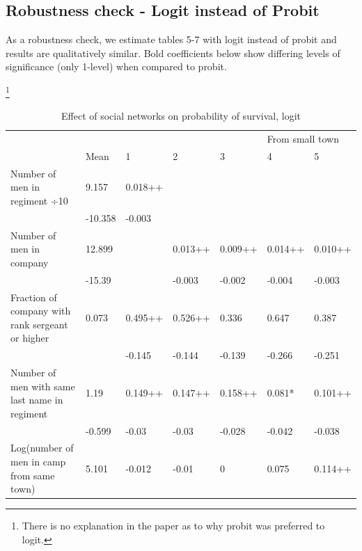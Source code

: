 \documentclass[draft.tex]{subfiles}
\begin{document}
\subsection{Robustness check - Logit instead of Probit}

As a robustness check, we estimate tables 5-7 with logit instead of probit and results are qualitatively similar. Bold coefficients below show differing levels of significance (only 1-level) when compared to probit.

\begin{table}
\caption{Effect of social networks on probability of survival, logit}\footnote{There is no explanation in the paper as to why probit was preferred to logit.}
\label{logit}
\begin{tabular}{lllllll}
\hline
                                                 &         &         &         &         & \multicolumn{2}{l}{From small town} \\
                                                 & Mean    & 1       & 2       & 3       & 4                                   & 5 \\
Number of men in regiment ÷10                    & 9.157   & 0.018++ &         &         &                                     &  \\
                                                 & -10.358 & -0.003  &         &         &                                     &  \\
Number of men in company                         & 12.899  &         & 0.013++ & 0.009++ & 0.014++                             & 0.010++ \\
                                                 & -15.39  &         & -0.003  & -0.002  & -0.004                              & -0.003 \\
Fraction of company with rank sergeant or higher & 0.073   & 0.495++ & 0.526++ & 0.336   & 0.647                               & 0.387 \\
                                                 &         & -0.145  & -0.144  & -0.139  & -0.266                              & -0.251 \\
Number of men with same last name in regiment    & 1.19    & 0.149++ & 0.147++ & 0.158++ & 0.081*                              & 0.101++ \\
                                                 & -0.599  & -0.03   & -0.03   & -0.028  & -0.042                              & -0.038 \\
Log(number of men in camp from same town)        & 5.101   & -0.012  & -0.01   & 0       & 0.075                               & 0.114++ \\

\end{tabular}
\end{table}
\end{document}

